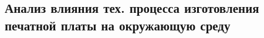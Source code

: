 \newpage

\subsection{Анализ влияния тех. процесса изготовления печатной платы на окружающую среду}
